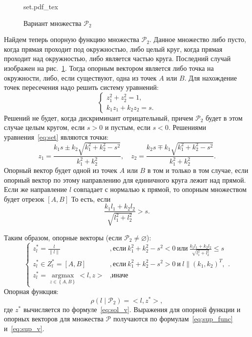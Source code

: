 \documentclass[12pt, a4paper]{article} %
\newcommand{\incfig}[1]{%
    \def\svgwidth{\columnwidth}
    {#1.pdf_tex}
}
\renewcommand{\le}{\leqslant}
\renewcommand{\emptyset}{\varnothing}
\newcommand{\inner}[2]{\bigl< #1, #2 \bigr>}
\DeclareMathOperator*{\argmax}{argmax}
\begin{document}
\begin{figure}[ht]
    \centering
    \incfig{set}
    \caption{Вариант множества $\mathcal{P}_2$}
    \label{fig:set}
\end{figure}

Найдем теперь опорную функцию множества $\mathcal{P}_2$. 
Данное множество либо пусто, когда прямая проходит под окружностью,
либо целый круг, когда прямая проходит над окружностью,
либо является частью круга.
Последний случай изображен на рис.~\ref{fig:set}.
Тогда опорным вектором является либо точка на окружности, либо,
если существуют, одна из точек $A$ или $B$.
Для нахождение точек пересечения надо решить систему уравнений:
\begin{equation}\label{eq:set}
    \begin{cases}
         z_1^2 + z_2^2 = 1,\\
        k_1 z_1 + k_2 z_2 = s.
    \end{cases} 
\end{equation}
Решений не будет, когда дискриминант отрицательный, причем $\mathcal{P}_2$
будет в этом случае целым кругом, если  $s > 0$ и пустым, если  $s < 0$. 
Решениями уравнения~\eqref{eq:set} являются точки:
\begin{equation}\label{eq:sol}
        z_1 = \dfrac{k_{1} s \pm k_{2} \sqrt{k_{1}^{2} + k_{2}^{2} - s^{2}}}{k_{1}^{2} + k_{2}^{2}}, \quad
        z_2 = \dfrac{k_{2} s \mp k_{1} \sqrt{k_{1}^{2} + k_{2}^{2} - s^{2}}}{k_{1}^{2} + k_{2}^{2}}.
\end{equation} 
Опорный вектор будет одной из точек $A$ или $B$ в том и только в том случае,
если опорный вектор по этому направлению для единичного круга лежит над прямой.
Если же направление $l$ совпадает с нормалью к прямой, то опорным множеством 
будет отрезок  $[A, B]$
То есть, если 
 \[
     \frac{k_1 l_1 + k_2l_2}{\sqrt{l_1^2 + l_2^2}} > s
.\] 

Таким образом, опорные векторы (если $\mathcal{P}_2 \neq \emptyset$):
\begin{equation}\label{eq:sol_v}
    \begin{cases}
        z^*_l = \frac{l}{\| l\|} &, 
        \text{если}\ k_1^2 + k_2^2 - s^2 < 0\ \text{или}\ 
        \frac{k_1 l_1 + k_2l_2}{\sqrt{l_1^2 + l_2^2}} \le s \\
        z^*_l \in Z^*_l = [A, B] &, 
        \text{если}\ k_1^2 + k_2^2 - s^2 > 0\ \text{и}\ 
        l \parallel (k_1, k_2)^T, \\
        z^*_l = \argmax\limits_{z \in \left\{ A, B \right\}}
        \inner{l}{z} &,\text{иначе}  
    \end{cases} 
.\end{equation} 
Опорная функция:
\begin{equation}
    \rho\left( l \mid \mathcal{P}_2 \right) = \inner{l}{z^*}
,\end{equation} 
где $z^*$ вычисляется по формуле~\eqref{eq:sol_v}.
Выражения для опорной функции и опорных векторов для множества 
$\mathcal{P}$ получаются по формулам~\eqref{eq:sup_func} и~\eqref{eq:sup_v}.
\end{document}
